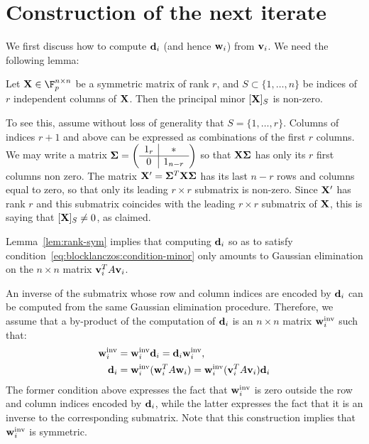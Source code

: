 \section{Construction of the next iterate}
We first discuss how to compute $\mathbf{d}_i$ (and hence
$\mathbf{w}_i$) from $\mathbf{v}_i$. 
    We need the following lemma:
\begin{lemma}
    \label{lem:rank-sym}
    Let $\bfX \in\F_p^{n\times n}$ be a symmetric matrix of rank
    $r$, and $S\subset\{1,\ldots,n\}$ be indices of $r$ independent
    columns of $\mathbf{X} $. Then the principal minor $[\mathbf{X} ]_S$ is
    non-zero.
\end{lemma}
To see this, assume without loss of generality that $S=\{1,\ldots,r\}$.
Columns of indices $r+1$ and above can be expressed as combinations of
the first $r$ columns. 
We may write a matrix $\mathbf{\Sigma}=\left(\begin{array}{c|c}1_r&\ast\\\hline0&1_{n-r}\end{array}\right)$ so
that $\mathbf{X} \mathbf{\Sigma}$ has only its $r$ first columns non zero.
The matrix $\mathbf X'=\mathbf{\Sigma}^T\mathbf{X} \mathbf{\Sigma}$ has its last $n-r$ rows
and columns equal to zero,
so that only its
leading $r\times r$ submatrix is non-zero. Since
$\mathbf{X} '$ has rank $r$ and this submatrix coincides with the leading
$r\times r$ submatrix of $\mathbf{X} $, this is saying that
$[\mathbf{X} ]_S\not=0$, as claimed.
\medskip

Lemma~\ref{lem:rank-sym} implies that computing $\mathbf{d}_i$ so as to
satisfy condition~\eqref{eq:blocklanczos:condition-minor}
only amounts to Gaussian elimination on the $n\times n$ matrix
$\mathbf{v}_i^TA\mathbf{v}_i$.

An inverse of the submatrix whose row and column indices are encoded by
$\mathbf{d}_i$ can be computed from the same Gaussian elimination procedure.
Therefore, we assume that a by-product of the computation of
$\mathbf{d}_i$ is an $n\times n$ matrix $\mathbf{w}_i^{\text{inv}}$ such that:
\begin{align*}
    \mathbf{w}_i^{\text{inv}} &= \mathbf{w}_i^{\text{inv}}\mathbf{d}_i = \mathbf{d}_i\mathbf{w}_i^{\text{inv}},\\
    \mathbf{d}_i &=
    \mathbf{w}_i^{\text{inv}}(\mathbf{w}_i^TA\mathbf{w}_i)=
    \mathbf{w}_i^{\text{inv}}(\mathbf{v}_i^TA\mathbf{v}_i)\mathbf{d}_i
\end{align*}
The former condition above expresses the fact that $\mathbf{w}_i^{\text{inv}}$ is zero
outside the row and column indices encoded by $\mathbf{d}_i$, while the latter
expresses the fact that it is an inverse to the corresponding submatrix.
Note that this construction implies that $\mathbf{w}_i^{\text{inv}}$ is symmetric.
\medskip



